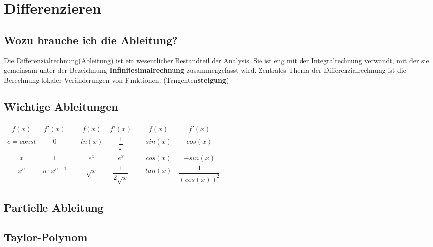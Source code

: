 \section{Differenzieren}

\subsection{Wozu brauche ich die Ableitung?}
Die Differenzialrechnung(Ableitung) ist ein wesentlicher Bestandteil der Analysis. Sie ist eng mit der Integralrechnung verwandt, mit der sie gemeinsam unter der Bezeichnung \textbf{\grqq Infinitesimalrechnung\grqq}  zusammengefasst wird. Zentrales Thema der Differenzialrechnung ist die Berechnung lokaler Veränderungen von Funktionen. (Tangenten\textbf{steigung})

\subsection{Wichtige Ableitungen}
\renewcommand{\arraystretch}{2.0}
\begin{tabular}{|c|c|c|c|c|c|c|c|}
	\cline{1-2}\cline{4-5}\cline{7-8}
	\boldmath${f(x)}$ & \boldmath${f'(x)}$ &\qquad\qquad\qquad& \boldmath${f(x)}$ & \boldmath${f'(x)}$ &\qquad\qquad\qquad& \boldmath${f(x)}$ & \boldmath${f'(x)}$\\
	\cline{1-2}\cline{4-5}\cline{7-8}
	$c=const$ & $0$ && $ln(x)$ & $\dfrac{1}{x}$ && $sin(x)$ & $cos(x)$\\
	\cline{1-2}\cline{4-5}\cline{7-8}
	$x$ & $1$ && $e^x$ & $e^x$ && $cos(x)$ & $-sin(x)$\\
	\cline{1-2}\cline{4-5}\cline{7-8}
	$x^n$ & $n\cdot x^{n-1}$ && $\sqrt{x}$ & $\dfrac{1}{2\sqrt{x}}$ && $tan(x)$ & $\dfrac{1}{(cos(x))^2}$\\
	\cline{1-2}\cline{4-5}\cline{7-8}
\end{tabular}

\subsection{Partielle Ableitung}

\subsection{Taylor-Polynom}






